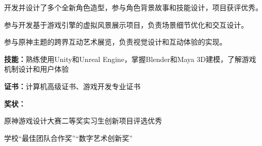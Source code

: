 





\begin{pblock} %
	\item {
		开发并设计了多个全新角色造型，参与角色背景故事和技能设计，项目获评优秀。 %
	}
\end{pblock}

\vspace{4pt} %
\begin{pblock} %
	\item 参与开发基于游戏引擎的虚拟风景展示项目，负责场景细节优化和交互设计。 %
\end{pblock}

\vspace{4pt} %
\begin{pblock} %
	\item 参与原神主题的跨界互动艺术展览，负责视觉设计和互动体验的实现。 %
\end{pblock}


\begin{plist} %
	\item \textbf{技能：}熟练使用Unity和Unreal Engine，掌握Blender和Maya 3D建模，了解游戏机制设计和用户体验 %
	\item \textbf{证书：}计算机高级证书、游戏开发专业证书 %
	\item \textbf{奖状：} %
	\begin{pitem}
		\item 原神游戏设计大赛二等奖\quad\qquad\qquad 实习生创新项目评选优秀 %
		\item 学校“最佳团队合作奖”\qquad\qquad\qquad\quad “数字艺术创新奖” 
	\end{pitem}
\end{plist} %



